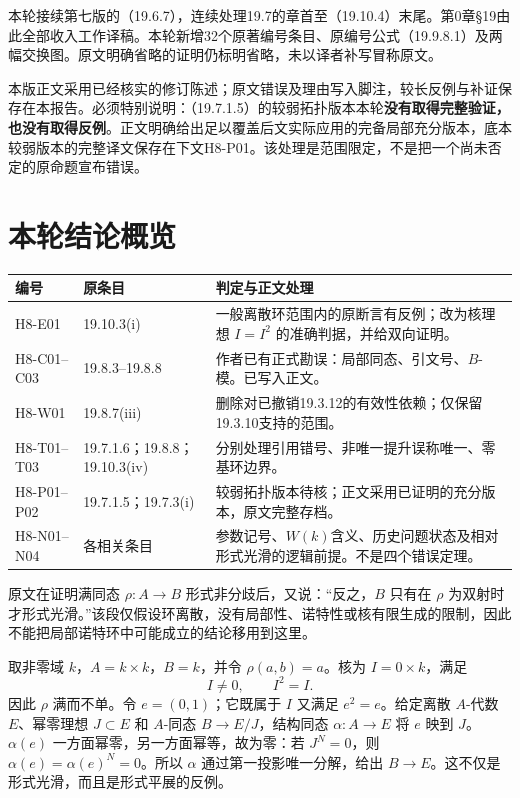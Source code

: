 本轮接续第七版的（19.6.7），连续处理19.7的章首至（19.10.4）末尾。第0章§19由此全部收入工作译稿。本轮新增32个原著编号条目、原编号公式（19.9.8.1）及两幅交换图。原文明确省略的证明仍标明省略，未以译者补写冒称原文。

本版正文采用已经核实的修订陈述；原文错误及理由写入脚注，较长反例与补证保存在本报告。必须特别说明：（19.7.1.5）的较弱拓扑版本本轮\textbf{没有取得完整验证，也没有取得反例}。正文明确给出足以覆盖后文实际应用的完备局部充分版本，底本较弱版本的完整译文保存在下文H8-P01。该处理是范围限定，不是把一个尚未否定的原命题宣布错误。

\section*{本轮结论概览}
\begin{longtable}{@{}p{.17\linewidth}p{.19\linewidth}p{.55\linewidth}@{}}
\toprule 编号 & 原条目 & 判定与正文处理\\\midrule\endhead
H8-E01 & 19.10.3(i) & 一般离散环范围内的原断言有反例；改为核理想 $I=I^2$ 的准确判据，并给双向证明。\\
H8-C01--C03 & 19.8.3--19.8.8 & 作者已有正式勘误：局部同态、引文号、$B$-模。已写入正文。\\
H8-W01 & 19.8.7(iii) & 删除对已撤销19.3.12的有效性依赖；仅保留19.3.10支持的范围。\\
H8-T01--T03 & 19.7.1.6；19.8.8；19.10.3(iv) & 分别处理引用错号、非唯一提升误称唯一、零基环边界。\\
H8-P01--P02 & 19.7.1.5；19.7.3(i) & 较弱拓扑版本待核；正文采用已证明的充分版本，原文完整存档。\\
H8-N01--N04 & 各相关条目 & 参数记号、$W(k)$含义、历史问题状态及相对形式光滑的逻辑前提。不是四个错误定理。\\
\bottomrule
\end{longtable}

原文在证明满同态 $\rho:A\to B$ 形式非分歧后，又说：“反之，$B$ 只有在 $\rho$ 为双射时才形式光滑。”该段仅假设环离散，没有局部性、诺特性或核有限生成的限制，因此不能把局部诺特环中可能成立的结论移用到这里。

取非零域 $k$，$A=k\times k$，$B=k$，并令 $\rho(a,b)=a$。核为 $I=0\times k$，满足
\[
 I\ne0,\qquad I^2=I.
\]
因此 $\rho$ 满而不单。令 $e=(0,1)$；它既属于 $I$ 又满足 $e^2=e$。给定离散 $A$-代数 $E$、幂零理想 $J\subset E$ 和 $A$-同态 $B\to E/J$，结构同态 $\alpha:A\to E$ 将 $e$ 映到 $J$。$\alpha(e)$ 一方面幂零，另一方面幂等，故为零：若 $J^N=0$，则 $\alpha(e)=\alpha(e)^N=0$。所以 $\alpha$ 通过第一投影唯一分解，给出 $B\to E$。这不仅是形式光滑，而且是形式平展的反例。

